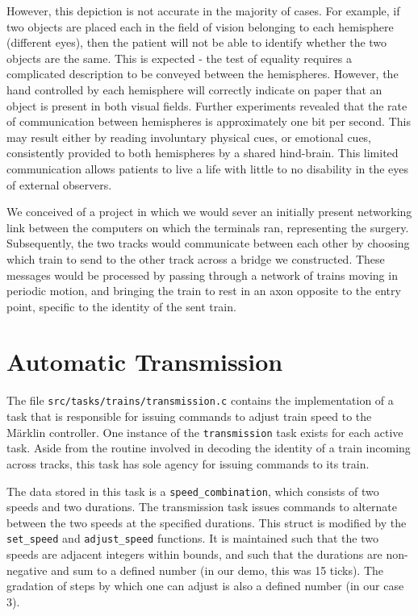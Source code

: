 \documentclass{amsart} \usepackage{amsmath} \usepackage{upgreek}
\newcommand{\x}[1]{\texttt{#1}}
\begin{document}
However, this depiction is not accurate in the majority of cases. For example,
if two objects are placed each in the field of vision belonging to each
hemisphere (different eyes), then the patient will not be able to identify
whether the two objects are the same. This is expected - the test of equality
requires a complicated description to be conveyed between the hemispheres.
However, the hand controlled by each hemisphere will correctly indicate on paper
that an object is present in both visual fields. Further experiments revealed
that the rate of communication between hemispheres is approximately one bit per
second. This may result either by reading involuntary physical cues, or
emotional cues, consistently provided to both hemispheres by a shared
hind-brain. This limited communication allows patients to live a life with
little to no disability in the eyes of external observers.

We conceived of a project in which we would sever an initially present
networking link between the computers on which the terminals ran, representing
the surgery. Subsequently, the two tracks would communicate between each other
by choosing which train to send to the other track across a bridge we
constructed. These messages would be processed by passing through a network of
trains moving in periodic motion, and bringing the train to rest in an axon
opposite to the entry point, specific to the identity of the sent train.

\section*{Automatic Transmission}

The file \x{src/tasks/trains/transmission.c} contains the implementation of a
task that is responsible for issuing commands to adjust train speed to the
M\"arklin controller. One instance of the \x{transmission} task exists for each
active task. Aside from the routine involved in decoding the identity of a train
incoming across tracks, this task has sole agency for issuing commands to its
train.

The data stored in this task is a \x{speed\_combination}, which consists of two
speeds and two durations. The transmission task issues commands to alternate
between the two speeds at the specified durations. This struct is modified by
the \x{set\_speed} and \x{adjust\_speed} functions. It is maintained such that
the two speeds are adjacent integers within bounds, and such that the durations
are non-negative and sum to a defined number (in our demo, this was 15 ticks).
The gradation of steps by which one can adjust is also a defined number (in our
case 3).
\end{document}
